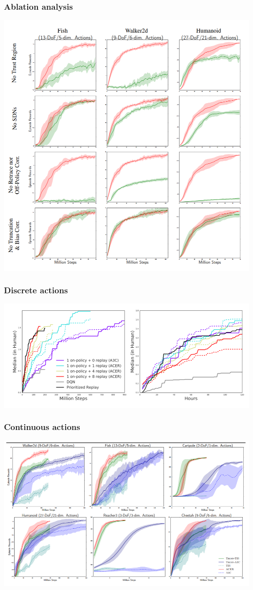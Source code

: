 \documentclass{beamer}
\begin{document}
\begin{frame}
\frametitle{Ablation analysis}
\begin{center}
\includegraphics[scale=0.22]{ablation}
\end{center}
\end{frame}

\begin{frame}
\frametitle{Discrete actions}
\begin{center}
\includegraphics[scale=0.34]{atari}
\end{center}
\end{frame}

\begin{frame}
\frametitle{Continuous actions}
\begin{center}
\includegraphics[scale=0.34]{mujoco}
\end{center}
\end{frame}
\end{document}
